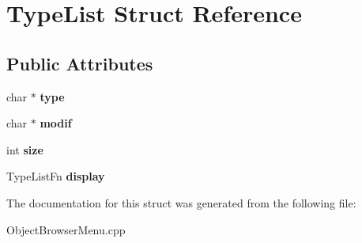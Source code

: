 \hypertarget{structTypeList}{
\section{TypeList Struct Reference}
\label{structTypeList}
}
\subsection*{Public Attributes}
\begin{DoxyCompactItemize}
\item 
\hypertarget{structTypeList_a3c0ae33a73e00ef08f72fa69b2c70114}{
char $\ast$ {\bfseries type}}
\label{structTypeList_a3c0ae33a73e00ef08f72fa69b2c70114}

\item 
\hypertarget{structTypeList_a0b31f04d29ccf89f134fc079f082c955}{
char $\ast$ {\bfseries modif}}
\label{structTypeList_a0b31f04d29ccf89f134fc079f082c955}

\item 
\hypertarget{structTypeList_a42e259d68c39b7315008cf044f5e6623}{
int {\bfseries size}}
\label{structTypeList_a42e259d68c39b7315008cf044f5e6623}

\item 
\hypertarget{structTypeList_aa0490d4be714cdda35fade2ba3f952d4}{
TypeListFn {\bfseries display}}
\label{structTypeList_aa0490d4be714cdda35fade2ba3f952d4}

\end{DoxyCompactItemize}


The documentation for this struct was generated from the following file:\begin{DoxyCompactItemize}
\item 
ObjectBrowserMenu.cpp\end{DoxyCompactItemize}
